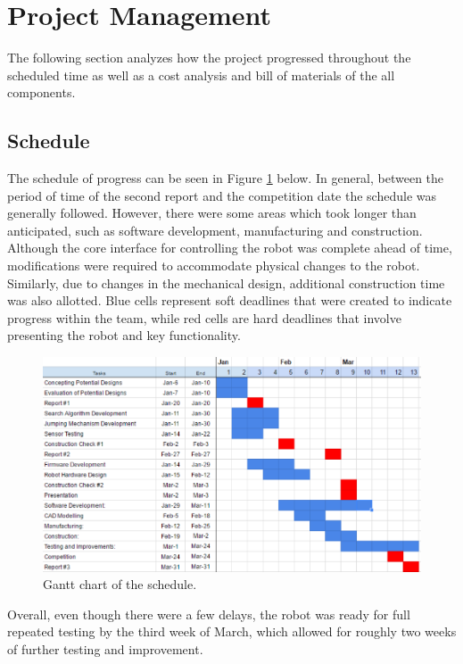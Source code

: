 \documentclass[ece]{uw-wkrpt}
\let\oldsection\section
\renewcommand\section{\clearpage\oldsection}
\begin{document}
\section{Project Management}
The following section analyzes how the project progressed throughout the scheduled time as well as a cost analysis and bill of materials of the all components.

\subsection{Schedule}

The schedule of progress can be seen in Figure \ref{fig:gantt} below. In general, between the period of time of the second report and the competition date the schedule was generally followed. However, there were some areas which took longer than anticipated, such as software development, manufacturing and construction. Although the core interface for controlling the robot was complete ahead of time, modifications were required to accommodate physical changes to the robot. Similarly, due to changes in the mechanical design, additional construction time was also allotted. Blue cells represent soft deadlines that were created to indicate progress within the team, while red cells are hard deadlines that involve presenting the robot and key functionality.

\begin{figure}
    \centering
    \includegraphics[width=5.5in]{res/gantChart}
    \caption[Gantt chart of the schedule]
          {Gantt chart of the schedule.}
    \label{fig:gantt}
\end{figure}

Overall, even though there were a few delays, the robot was ready for full repeated testing by the third week of March, which allowed for roughly two weeks of further testing and improvement.
\end{document}
